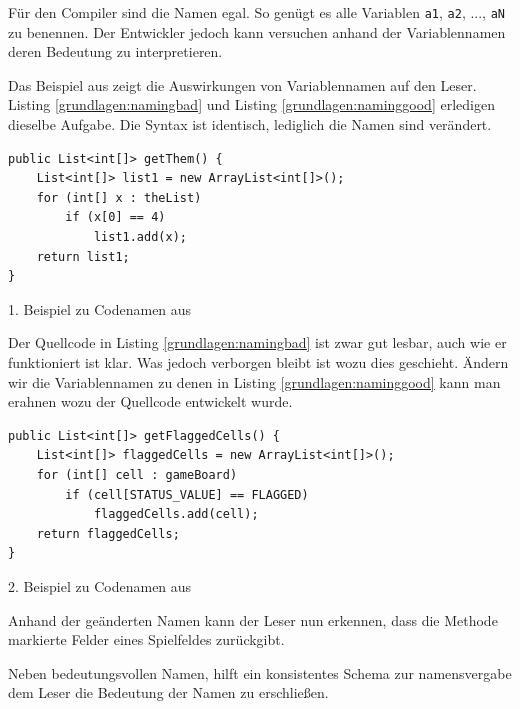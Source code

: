 Für den Compiler sind die Namen egal. So genügt es alle Variablen \texttt{a1},
\texttt{a2}, ..., \texttt{aN} zu benennen. Der Entwickler jedoch kann versuchen anhand der  Variablennamen deren Bedeutung zu  interpretieren.

Das Beispiel aus \cite[S. 46-47]{Martin} zeigt die Auswirkungen von Variablennamen auf den Leser. Listing \ref{grundlagen:namingbad} und Listing \ref{grundlagen:naminggood} erledigen dieselbe Aufgabe. Die Syntax ist identisch, lediglich die Namen sind verändert.

\begin{listing}
    \begin{verbatim}
public List<int[]> getThem() {
    List<int[]> list1 = new ArrayList<int[]>();
    for (int[] x : theList)
        if (x[0] == 4)
            list1.add(x);
    return list1;
}
    \end{verbatim}
    \caption{1. Beispiel zu Codenamen aus \cite[S. 46]{Martin}}
    \label{grundlagen:namingbad}
\end{listing}

Der Quellcode in Listing \ref{grundlagen:namingbad} ist zwar gut lesbar, auch wie er funktioniert ist klar. Was jedoch verborgen bleibt ist wozu dies geschieht. 
Ändern wir die Variablennamen zu denen in Listing \ref{grundlagen:naminggood} kann man erahnen wozu der Quellcode entwickelt wurde.

\begin{listing}
    \begin{verbatim}
public List<int[]> getFlaggedCells() {
    List<int[]> flaggedCells = new ArrayList<int[]>();
    for (int[] cell : gameBoard)
        if (cell[STATUS_VALUE] == FLAGGED)
            flaggedCells.add(cell);
    return flaggedCells;
}
    \end{verbatim}
    \caption{2. Beispiel zu Codenamen aus \cite[S. 47]{Martin}}
    \label{grundlagen:naminggood}
\end{listing}

Anhand der geänderten Namen kann der Leser nun erkennen, dass die Methode markierte Felder eines Spielfeldes zurückgibt.

Neben bedeutungsvollen Namen, hilft ein konsistentes Schema zur namensvergabe dem Leser die Bedeutung der Namen zu erschließen. 

